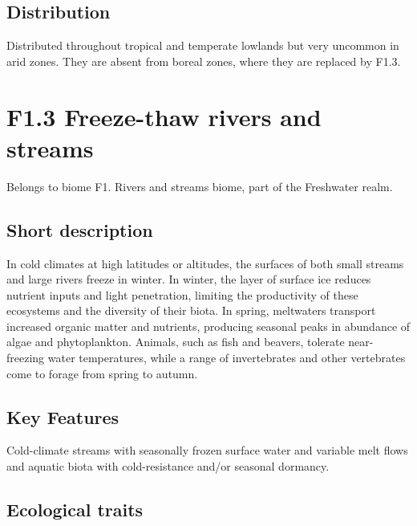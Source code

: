 \documentclass[
  letterpaper,
  DIV=11,
  numbers=noendperiod]{scrartcl}
\begin{document}
\subsection{Distribution}\label{distribution-1}

Distributed throughout tropical and temperate lowlands but very uncommon
in arid zones. They are absent from boreal zones, where they are
replaced by F1.3.

\section{F1.3 Freeze-thaw rivers and
streams}\label{f1.3-freeze-thaw-rivers-and-streams}

Belongs to biome F1. Rivers and streams biome, part of the Freshwater
realm.

\subsection{Short description}\label{short-description-2}

In cold climates at high latitudes or altitudes, the surfaces of both
small streams and large rivers freeze in winter. In winter, the layer of
surface ice reduces nutrient inputs and light penetration, limiting the
productivity of these ecosystems and the diversity of their biota. In
spring, meltwaters transport increased organic matter and nutrients,
producing seasonal peaks in abundance of algae and phytoplankton.
Animals, such as fish and beavers, tolerate near-freezing water
temperatures, while a range of invertebrates and other vertebrates come
to forage from spring to autumn.

\subsection{Key Features}\label{key-features-2}

Cold-climate streams with seasonally frozen surface water and variable
melt flows and aquatic biota with cold-resistance and/or seasonal
dormancy.

\subsection{Ecological traits}\label{ecological-traits-2}
\end{document}
